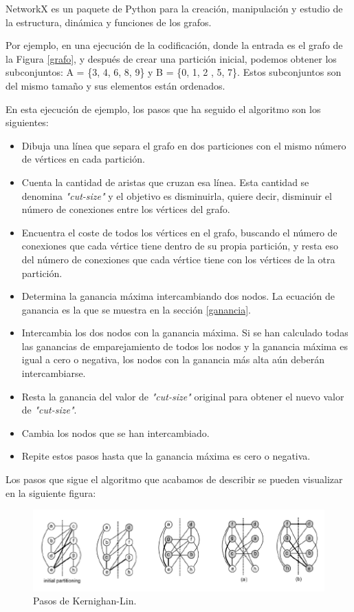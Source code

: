 \begin{mydef}\label{NetworkX}
	NetworkX es un paquete de Python para la creación, manipulación y estudio de la estructura, dinámica y funciones de los grafos. 
\end{mydef}

Por ejemplo, en una ejecución de la codificación, donde la entrada es el grafo de la Figura \ref{grafo}, y después de crear una partición inicial, podemos obtener los subconjuntos: A = \{3, 4, 6, 8, 9\} y B = \{0, 1, 2 , 5, 7\}. Estos subconjuntos son del mismo tamaño y sus elementos están ordenados.

En esta ejecución de ejemplo, los pasos que ha seguido el algoritmo son los siguientes:

\begin{itemize}
	\item Dibuja una línea que separa el grafo en dos particiones con el mismo número de vértices en cada partición.
	\item Cuenta la cantidad de aristas que cruzan esa línea. Esta cantidad se denomina \textit{"cut-size"} y el objetivo es disminuirla, quiere decir, disminuir el número de conexiones entre los vértices del grafo.
	\item Encuentra el coste de todos los vértices en el grafo, buscando el número de conexiones que cada vértice tiene dentro de su propia partición, y resta eso del número de conexiones que cada vértice tiene con los vértices de la otra partición.
	\item Determina la ganancia máxima intercambiando dos nodos. La ecuación de ganancia es la que se muestra en la sección \ref{ganancia}.
	\item Intercambia los dos nodos con la ganancia máxima. Si se han calculado todas las ganancias de emparejamiento de todos los nodos y la ganancia máxima es igual a cero o negativa, los nodos con la ganancia más alta aún deberán intercambiarse.
	\item Resta la ganancia del valor de \textit{"cut-size"} original para obtener el nuevo valor de \textit{"cut-size"}.
	\item Cambia los nodos que se han intercambiado.
	\item Repite estos pasos hasta que la ganancia máxima es cero o negativa.
\end{itemize}

\newpage
Los pasos que sigue el algoritmo que acabamos de describir se pueden visualizar en la siguiente figura:

\begin{figure}[h]
	\centering
	\includegraphics{Figures/KL_steps}
	\vspace{1mm}
	\caption{Pasos de Kernighan-Lin.}
	\label{KL_steps}
\end{figure}


